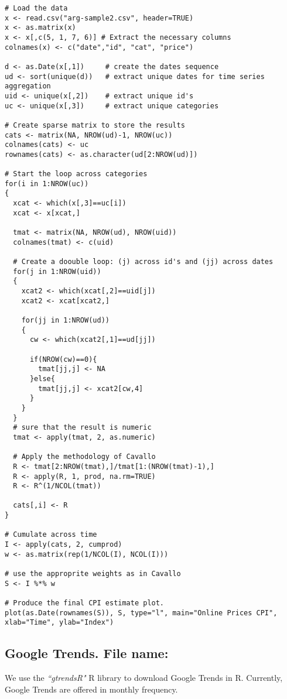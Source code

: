 \documentclass[12pt]{article}
\begin{document}
\begin{lstlisting}[title=\textbf{Web Prices Aggregation and Plots.}]
# Load the data
x <- read.csv("arg-sample2.csv", header=TRUE)
x <- as.matrix(x)
x <- x[,c(5, 1, 7, 6)] # Extract the necessary columns
colnames(x) <- c("date","id", "cat", "price")

d <- as.Date(x[,1])		# create the dates sequence
ud <- sort(unique(d))	# extract unique dates for time series aggregation
uid <- unique(x[,2])	# extract unique id's
uc <- unique(x[,3])		# extract unique categories

# Create sparse matrix to store the results
cats <- matrix(NA, NROW(ud)-1, NROW(uc))
colnames(cats) <- uc
rownames(cats) <- as.character(ud[2:NROW(ud)])

# Start the loop across categories
for(i in 1:NROW(uc))
{
  xcat <- which(x[,3]==uc[i])
  xcat <- x[xcat,]

  tmat <- matrix(NA, NROW(ud), NROW(uid))
  colnames(tmat) <- c(uid)

  # Create a doouble loop: (j) across id's and (jj) across dates
  for(j in 1:NROW(uid))
  {
    xcat2 <- which(xcat[,2]==uid[j])
    xcat2 <- xcat[xcat2,]

    for(jj in 1:NROW(ud))
    {
      cw <- which(xcat2[,1]==ud[jj])

      if(NROW(cw)==0){
        tmat[jj,j] <- NA
      }else{
        tmat[jj,j] <- xcat2[cw,4]
      }
    }
  }
  # sure that the result is numeric
  tmat <- apply(tmat, 2, as.numeric)

  # Apply the methodology of Cavallo
  R <- tmat[2:NROW(tmat),]/tmat[1:(NROW(tmat)-1),]
  R <- apply(R, 1, prod, na.rm=TRUE)
  R <- R^(1/NCOL(tmat))

  cats[,i] <- R
}

# Cumulate across time
I <- apply(cats, 2, cumprod)
w <- as.matrix(rep(1/NCOL(I), NCOL(I)))

# use the approprite weights as in Cavallo
S <- I %*% w

# Produce the final CPI estimate plot.
plot(as.Date(rownames(S)), S, type="l", main="Online Prices CPI", xlab="Time", ylab="Index")
\end{lstlisting}

\subsection{Google Trends. File name: \color{blue}{Google.R}}

We use the \emph{``gtrendsR"} R library to download Google Trends in R.
Currently, Google Trends are offered in monthly frequency.
\end{document}
